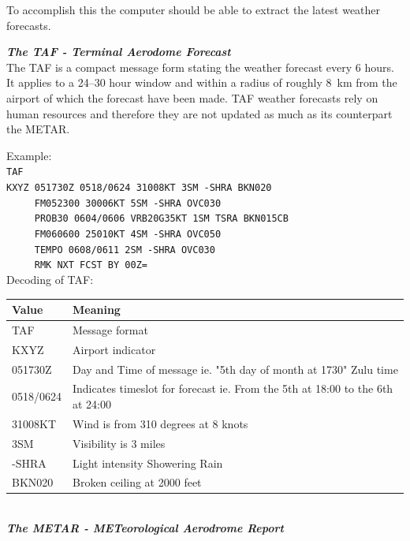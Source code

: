 To accomplish this the computer should be able to extract the latest weather forecasts.

\emph{\textbf{The TAF - Terminal Aerodome Forecast}}\\
The TAF is a compact message form stating the weather forecast every 6 hours. It applies to a 24--30 hour window and within a radius of roughly \SI{8}{\kilo\meter} from the airport of which the forecast have been made. 
TAF weather forecasts rely on human resources and therefore they are not updated as much as its counterpart the METAR. 

Example:\\
\verb|TAF|\\
\verb|KXYZ 051730Z 0518/0624 31008KT 3SM -SHRA BKN020|\\
\verb|     FM052300 30006KT 5SM -SHRA OVC030|\\
\verb|     PROB30 0604/0606 VRB20G35KT 1SM TSRA BKN015CB|\\
\verb|     FM060600 25010KT 4SM -SHRA OVC050|\\
\verb|     TEMPO 0608/0611 2SM -SHRA OVC030|\\
\verb|     RMK NXT FCST BY 00Z=|\\

Decoding of TAF:

\begin{tabular}{ll}
	\toprule
	\textbf{Value} & \textbf{Meaning}                    \\\midrule
	TAF            & Message format                      \\
	KXYZ           & Airport indicator                   \\
	051730Z        & Day and Time of message ie. "5th day of month at 1730" Zulu time \\
	
	0518/0624      & Indicates timeslot for forecast ie. From the 5th at 18:00 to the 6th at 24:00 \\
	31008KT        & Wind is from 310 degrees at 8 knots \\
	3SM            & Visibility is 3 miles               \\
	-SHRA          & Light intensity Showering Rain      \\
	BKN020         & Broken ceiling at 2000 feet         \\\bottomrule
\end{tabular}
~\\
\emph{\textbf{The METAR - METeorological Aerodrome Report}}

